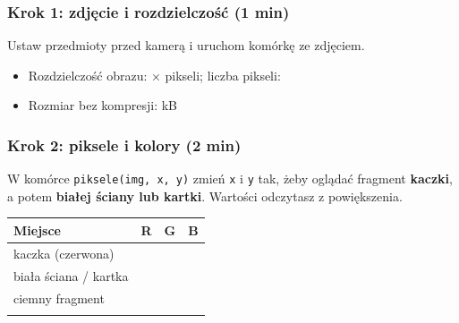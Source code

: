\subsubsection{Krok 1: zdjęcie i rozdzielczość (1 min)}\label{krok-1-zdjux119cie-i-rozdzielczoux15bux107-1-min}

Ustaw przedmioty przed kamerą i uruchom komórkę ze zdjęciem.

\begin{itemize}
\tightlist
\item
  Rozdzielczość obrazu:  ×  pikseli; liczba pikseli: 
\item
  Rozmiar bez kompresji:  kB
\end{itemize}

\subsubsection{Krok 2: piksele i kolory (2 min)}\label{krok-2-piksele-i-kolory-2-min}

W komórce \texttt{piksele(img,\ x,\ y)} zmień \texttt{x} i \texttt{y} tak, żeby oglądać fragment \textbf{kaczki}, a potem \textbf{białej ściany lub kartki}. Wartości odczytasz z powiększenia.

\par\noindent\begin{minipage}{\linewidth}
\begin{tabular}{@{}
  >{\raggedright\arraybackslash}p{}
  >{\raggedright\arraybackslash}p{}
  >{\raggedright\arraybackslash}p{}
  >{\raggedright\arraybackslash}p{}@{}}
\toprule\noalign{}
\begin{minipage}[b]{\linewidth}\raggedright
Miejsce
\end{minipage} & \begin{minipage}[b]{\linewidth}\raggedright
R
\end{minipage} & \begin{minipage}[b]{\linewidth}\raggedright
G
\end{minipage} & \begin{minipage}[b]{\linewidth}\raggedright
B
\end{minipage} \\
\midrule\noalign{}
kaczka (czerwona) & & & \\
biała ściana / kartka & & & \\
ciemny fragment & & & \\
\bottomrule\noalign{}
\end{tabular}
\end{minipage}\par\medskip

